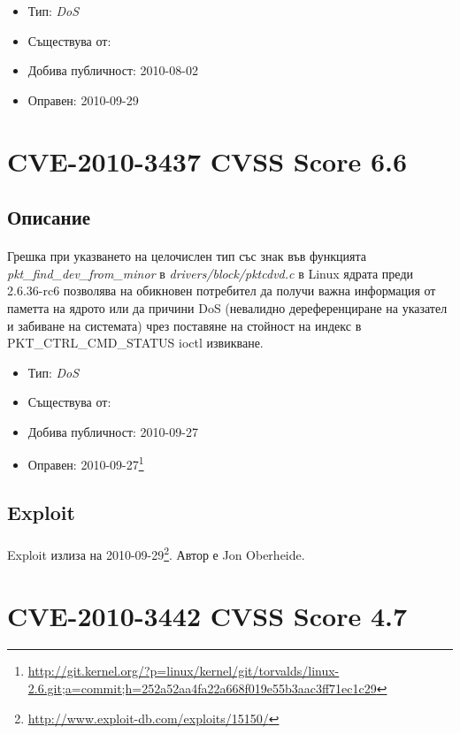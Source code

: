 \documentclass[a4paper,12pt,leqno]{article}
\begin{document}
\begin{itemize}
    \item Тип: \textit{DoS}
    \item Съществува от:
  	\item Добива публичност: 2010-08-02
    \item Оправен: 2010-09-29
\end{itemize}

\section{CVE-2010-3437 CVSS Score 6.6}
\subsection{Описание}
\paragraph{}
Грешка при указването на целочислен тип със знак във функцията \\ \textit{pkt\_find\_dev\_from\_minor} в \textit{drivers/block/pktcdvd.c} в Linux ядрата преди 2.6.36-rc6 позволява на обикновен потребител да получи важна информация от паметта на ядрото или да причини DoS (невалидно дереференциране на указател и забиване на системата) чрез поставяне на стойност на индекс в \\ PKT\_CTRL\_CMD\_STATUS ioctl извикване.

\begin{itemize}
    \item Тип: \textit{DoS}
    \item Съществува от:
  	\item Добива публичност: 2010-09-27
    \item Оправен: 2010-09-27\footnote{\url{http://git.kernel.org/?p=linux/kernel/git/torvalds/linux-2.6.git;a=commit;h=252a52aa4fa22a668f019e55b3aac3ff71ec1c29}}
\end{itemize}

\subsection{Exploit}
\paragraph{}
Exploit излиза на 2010-09-29\footnote{\url{http://www.exploit-db.com/exploits/15150/}}. Автор е Jon Oberheide.


\section{CVE-2010-3442 CVSS Score 4.7}
\end{document}
